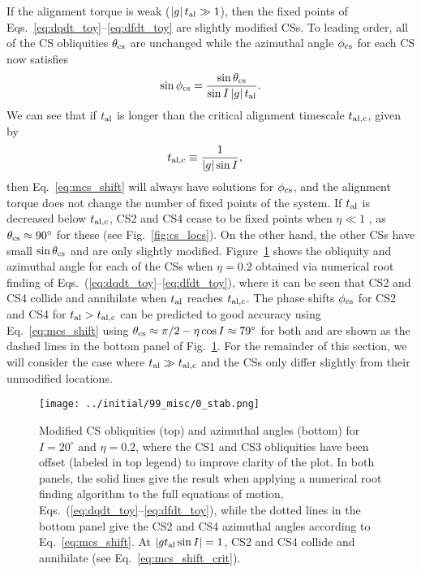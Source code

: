 \documentclass[
        fleqn,
        usenatbib,
        referee
    ]{mnras}
\newcommand*{\abs}[1]{\left|#1\right|}
\newlength{\colummwidth}
\begin{document}
If the alignment torque is weak ($\abs{g}t_{\rm al} \gg 1$), then the fixed
points of Eqs.~\eqref{eq:dqdt_toy}--\eqref{eq:dfdt_toy} are slightly modified
CSs. To leading order, all of the CS obliquities $\theta_{\rm cs}$ are unchanged
while the azimuthal angle $\phi_{\rm cs}$ for each CS now satisfies
\begin{equation}
    \sin \phi_{\rm cs} = \frac{\sin\theta_{\rm cs}}{\sin I \abs{g}t_{\rm al}}.
        \label{eq:mcs_shift}
\end{equation}
We can see that if $t_{\rm al}$ is longer than the critical alignment
timescale $t_{\rm al, c}$, given by
\begin{align}
    t_{\rm al, c} &\equiv \frac{1}{\abs{g}\sin I},\label{eq:mcs_shift_crit}
\end{align}
then Eq.~\eqref{eq:mcs_shift} will always have solutions for $\phi_{\rm cs}$,
and the alignment torque does not change the number of fixed points of the
system. If $t_{\rm al}$ is decreased below $t_{\rm al, c}$, CS2 and CS4 cease to
be fixed points when $\eta \ll 1$ \citep[as first noted in][]{fabrycky_otides},
as $\theta_{\rm cs} \approx 90^\circ$ for these (see Fig.~\ref{fig:cs_locs}). On
the other hand, the other CSs have small $\sin \theta_{\rm cs}$ and are only
slightly modified. Figure~\ref{fig:mcs} shows the obliquity and azimuthal
angle for each of the CSs when $\eta = 0.2$ obtained via numerical root finding
of Eqs.~(\ref{eq:dqdt_toy}--\ref{eq:dfdt_toy}), where it can be seen that CS2
and CS4 collide and annihilate when $t_{\rm al}$ reaches $t_{\rm al, c}$. The
phase shifts $\phi_{\rm cs}$ for CS2 and CS4 for $t_{\rm al} > t_{\rm al, c}$ can
be predicted to good accuracy using Eq.~\eqref{eq:mcs_shift} using $\theta_{\rm
cs} \approx \pi/2 - \eta \cos I \approx 79^\circ$ \citep{su2020} for both and
are shown as the dashed lines in the bottom panel of Fig.~\ref{fig:mcs}. For the
remainder of this section, we will consider the case where $t_{\rm al} \gg
t_{\rm al, c}$ and the CSs only differ slightly from their unmodified
locations.
\begin{figure}
    \centering
    \texttt{[image: ../initial/99\_misc/0\_stab.png]}
    \caption{Modified CS obliquities (top) and azimuthal angles (bottom) for $I
    = 20^\circ$ and $\eta = 0.2$, where the CS1 and CS3 obliquities have been
    offset (labeled in top legend) to improve clarity of the plot. In both
    panels, the solid lines give the result when applying a numerical root
    finding algorithm to the full equations of motion,
    Eqs.~(\ref{eq:dqdt_toy}--\ref{eq:dfdt_toy}), while the dotted lines in the
    bottom panel give the CS2 and CS4 azimuthal angles according to
    Eq.~\eqref{eq:mcs_shift}. At $\abs{gt_{\rm al} \sin I} = 1$, CS2 and CS4
    collide and annihilate (see Eq.~\ref{eq:mcs_shift_crit}).}\label{fig:mcs}
\end{figure}
\end{document}
